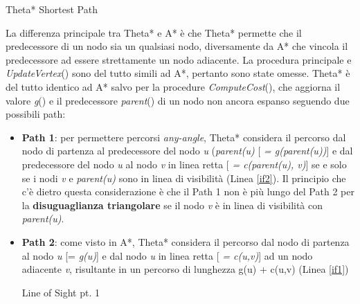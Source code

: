 \documentclass[11pt]{book}
\begin{document}
\begin{algorithm}
\PrintSemicolon
\caption{Theta* Shortest Path}
  \LinesNumbered
\setcounter{AlgoLine}{32}
\end{algorithm}

\par{
La differenza principale tra Theta* e  A* \`e che Theta* permette che il predecessore di un nodo sia un qualsiasi nodo, diversamente da A* che vincola il predecessore ad essere strettamente un nodo adiacente. La procedura principale e \emph{UpdateVertex}() sono del tutto simili ad A*, pertanto sono state omesse. Theta* \`e del tutto identico ad A* salvo per la procedure \emph{ComputeCost}(), che aggiorna il valore \emph{g}() e il predecessore \emph{parent}() di un nodo non ancora espanso seguendo due possibili path:
\begin{itemize}
\item \textbf{Path 1}: per permettere percorsi \emph{any-angle}, Theta* considera il percorso dal nodo di partenza al predecessore del nodo \emph{u} (\emph{parent(u)} [ \emph{= g(parent(u))}] e dal predecessore del nodo \emph{u} al nodo \emph{v} in linea retta [ \emph{= c(parent(u), v)}] se e solo se i nodi \emph{v} e \emph{parent(u)} sono in linea di visibilit\`a (Linea \ref{if2}). Il principio che c'\`e dietro questa considerazione \`e che il Path 1 non \`e pi\`u lungo del Path 2 per la \textbf{disuguaglianza triangolare} se il nodo \emph{v} \`e in linea di visibilit\`a con \emph{parent(u)}.
\item \textbf{Path 2}: come visto in A*, Theta* considera il percorso dal nodo di partenza al nodo \emph{u} [= \emph{g(u)}] e dal nodo \emph{u} in linea retta [ \emph{= c(u,v)}] ad un nodo adiacente \emph{v}, risultante in un percorso di lunghezza g(u) + c(u,v) (Linea \ref{if1})
\begin{algorithm}
\PrintSemicolon
\caption{Line of Sight pt. 1}
  \LinesNumbered

\end{algorithm}
\end{itemize}}
\end{document}
